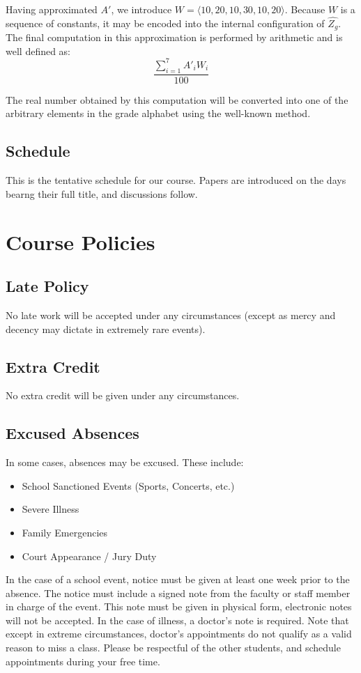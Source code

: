 \documentclass[11pt]{article}
\begin{document}
Having approximated $A'$, we introduce $W=\langle 10,
20, 10, 30, 10, 20\rangle$.  Because $W$ is
a sequence of constants, it may be encoded into the internal
configuration of $\hat{Z_g}$.  The final computation in
this approximation is performed by arithmetic and is well defined as:
\[
\displaystyle\frac{\sum_{i=1}^7 A'_i W_i}{100}
\]

The real number obtained by this computation will be converted into
one of the arbitrary elements in the grade alphabet using the
well-known method.

\subsection*{Schedule}
This is the tentative schedule for our course.  Papers are introduced
on the days bearng their full title, and discussions follow.




\newpage
\section*{Course Policies}

\subsection*{Late Policy}
No late work will be accepted under any circumstances (except as mercy
and decency may dictate in extremely rare events).

\subsection*{Extra Credit}
No extra credit will be given under any circumstances.

\subsection*{Excused Absences}
In some cases, absences may be excused. These include:
\begin{itemize}
    \item School Sanctioned Events (Sports, Concerts, etc.)
    \item Severe Illness
    \item Family Emergencies
    \item Court Appearance / Jury Duty
\end{itemize}
In the case of a school event, notice must be given at least one week
prior to the absence. The notice must include a signed note from the
faculty or staff member in charge of the event. This note must be
given in physical form, electronic notes will not be accepted.
In the case of illness, a doctor's note is required. Note that
except in extreme circumstances, doctor's appointments do not qualify as a valid reason to miss
a class. Please be respectful of the other students, and schedule
appointments during your free time.
\end{document}
